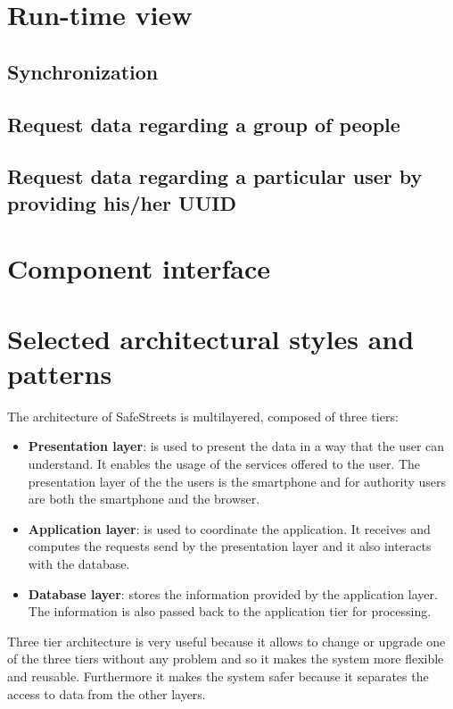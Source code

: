     \section{Run-time view}
        \subsection{Synchronization}
        \subsection{Request data regarding a group of people}
        \subsection{Request data regarding a particular user by providing his/her UUID}
    \section{Component interface}
    \section{Selected architectural styles and patterns}  
    The architecture of SafeStreets is multilayered, composed of three tiers:
    \begin{itemize}
        \item \textbf{Presentation layer}: is used to present the data in a way
        that the user can understand. It enables the usage of the services
        offered to the user. The presentation layer of the the users is the
        smartphone and for authority users are both the smartphone and the browser.
        \item \textbf{Application layer}: is used to coordinate the application.
        It receives and computes the requests send by the presentation layer and
        it also interacts with the database.
        \item \textbf{Database layer}: stores the information provided by the
        application layer. The information is also passed back to the
        application tier for processing.
    \end{itemize}    
    Three tier architecture is very useful because it allows to change or upgrade
    one of the three tiers without any problem and so it makes the system more
    flexible and reusable. Furthermore it makes the system safer because it
    separates the access to data from the other layers.
  
